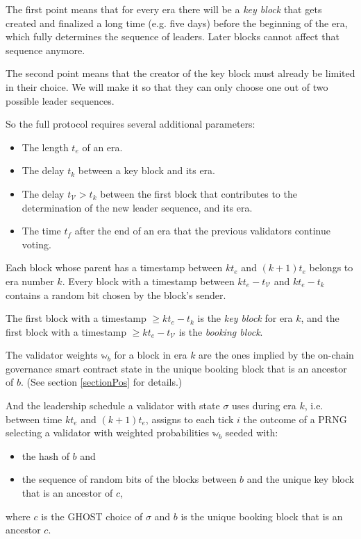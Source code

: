 \documentclass[12pt]{article}
\begin{document}
The first point means that for every era there will be a \emph{key block} that gets created and finalized a long time (e.g. five days) before the beginning of the era, which fully determines the sequence of leaders. Later blocks cannot affect that sequence anymore.

The second point means that the creator of the key block must already be limited in their choice. We will make it so that they can only choose one out of two possible leader sequences.

So the full protocol requires several additional parameters:
\begin{itemize}
  \item The length $t_e$ of an era.
  \item The delay $t_k$ between a key block and its era.
  \item The delay $t_{\mathcal{V}} > t_k$ between the first block that contributes to the determination of the new leader sequence, and its era.
  \item The time $t_f$ after the end of an era that the previous validators continue voting.
\end{itemize}

Each block whose parent has a timestamp between $k t_e$ and $(k + 1) t_e$ belongs to era number $k$.
Every block with a timestamp between $k t_e - t_{\mathcal{V}}$ and $k t_e - t_k$ contains a random bit chosen by the block's sender.

The first block with a timestamp $\geq k t_e - t_k$ is the \emph{key block} for era $k$, and the first block with a timestamp $\geq k t_e - t_{\mathcal{V}}$ is the \emph{booking block}.

The validator weights $\mathbb{w}_b$ for a block in era $k$ are the ones implied by the on-chain governance smart contract state in the unique booking block that is an ancestor of $b$. (See section \ref{sectionPos} for details.)

And the leadership schedule a validator with state $\sigma$ uses during era $k$, i.e. between time $k t_e$ and $(k + 1) t_e$, assigns to each tick $i$ the outcome of a PRNG selecting a validator with weighted probabilities $\mathbb{w}_b$ seeded with:
\begin{itemize}
  \item the hash of $b$ and
  \item the sequence of random bits of the blocks between $b$ and the unique key block that is an ancestor of $c$,
\end{itemize}
where $c$ is the GHOST choice of $\sigma$ and $b$ is the unique booking block that is an ancestor $c$.
\end{document}
